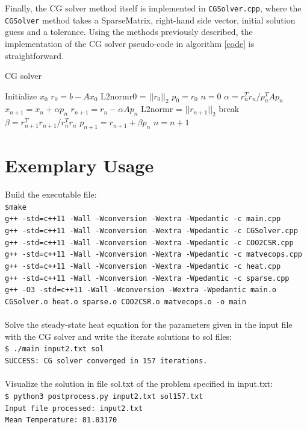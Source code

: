 \documentclass{article}
\begin{document}
Finally, the CG solver method itself is implemented in \texttt{CGSolver.cpp}, where the \texttt{CGSolver} method takes a SparseMatrix, right-hand side vector, initial solution guess and a tolerance. Using the methods previously described, the implementation of the CG solver pseudo-code in algorithm \ref{code} is straightforward.

\vspace{0.5cm}
\begin{algorithm}
\caption{CG solver}\label{alg:cg}
\label{code}
\begin{algorithmic}
\State Initialize $x_0$
\State $r_0 = b - Ax_0$
\State L2normr0 = $||r_0||_2$
\State $p_0 = r_0$
\State $n = 0$
\State $\alpha = r_n^T r_n / p_n^T A p_n$
\State $x_{n+1} = x_n + \alpha p_n$
\State $r_{n+1} = r_n - \alpha A p_n$
\State L2normr = $||r_{n+1}||_2$
\State break
\EndIf
\State $\beta = r_{n+1}^T r_{n+1} / r_n^T r_n$
\State $p_{n+1} = r_{n+1} + \beta p_n$
\State $n = n + 1$
\EndWhile
\end{algorithmic}
\end{algorithm}

\section{Exemplary Usage}
Build the executable file:\\
\texttt{\$make\\
g++ -std=c++11 -Wall -Wconversion -Wextra -Wpedantic -c main.cpp\\
g++ -std=c++11 -Wall -Wconversion -Wextra -Wpedantic -c CGSolver.cpp\\
g++ -std=c++11 -Wall -Wconversion -Wextra -Wpedantic -c COO2CSR.cpp\\
g++ -std=c++11 -Wall -Wconversion -Wextra -Wpedantic -c matvecops.cpp\\
g++ -std=c++11 -Wall -Wconversion -Wextra -Wpedantic -c heat.cpp\\
g++ -std=c++11 -Wall -Wconversion -Wextra -Wpedantic -c sparse.cpp\\
g++ -O3 -std=c++11 -Wall -Wconversion -Wextra -Wpedantic main.o CGSolver.o heat.o sparse.o COO2CSR.o matvecops.o -o main}\\
\vspace{0.05cm}\\
Solve the steady-state heat equation for the parameters given in the input file with the CG solver and write the iterate solutions to sol files:\\
\texttt{\$ ./main input2.txt sol\\
SUCCESS: CG solver converged in 157 iterations.}\\
\vspace{0.05cm}\\
Visualize the solution in file sol.txt of the problem specified in input.txt:\\
\texttt{\$ python3 postprocess.py input2.txt sol157.txt\\
Input file processed: input2.txt\\
Mean Temperature: 81.83170}
\end{document}

